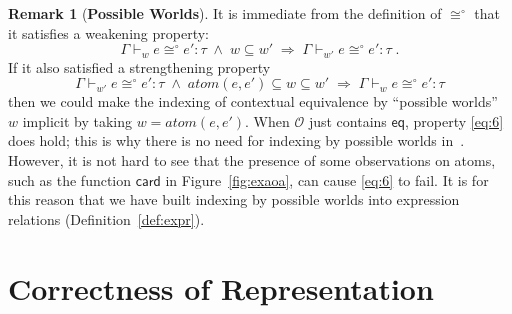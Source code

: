 \documentclass{LMCS}
\theoremstyle{plain}
\theoremstyle{definition}
\newtheorem{remark}[thm]{Remark}
\newcommand{\atoms}{\mathit{atom}}
\renewcommand{\conj}{\wedge}
\newcommand{\ent}{\vdash}
\renewcommand{\exp}[1][e]{#1}
\newcommand{\imp}{\Rightarrow}
\newcommand{\kw}[1]{\mathsf{#1}}
\newcommand{\Obs}{\mathcal{O}}
\newcommand{\OBS}[1][obs]{\kw{#1}}
\newcommand{\ofty}{:}
\newcommand{\opeqo}{\cong^{\circ}}
\newcommand{\ty}{\tau}
\newcommand{\w}[1][w]{#1}
\begin{document}
\begin{remark}[\textbf{Possible Worlds}]
  \label{rem:posw}
  It is immediate from the definition of $\opeqo$ that it satisfies a
  weakening property:
  \begin{equation}
    \label{eq:7}
    \Gamma\ent_{\w}\exp\opeqo\exp'\ofty\ty
    \;\conj\;
    \w\subseteq\w'
    \;\imp\;
    \Gamma\ent_{\w'}\exp\opeqo\exp'\ofty\ty\;.   
  \end{equation}
  If it also satisfied a strengthening property
  \begin{equation}
    \label{eq:6}
    \Gamma\ent_{\w'}\exp\opeqo\exp'\ofty\ty \;\conj\;
    \atoms(\exp,\exp')\subseteq\w\subseteq\w'
    \;\imp\; \Gamma\ent_{\w}\exp\opeqo\exp'\ofty\ty
  \end{equation}
  then we could make the indexing of contextual equivalence by
  ``possible worlds'' $\w$ implicit by taking $\w=\atoms(\exp,\exp')$.
  When $\Obs$ just contains $\OBS[eq]$, property \eqref{eq:6} does
  hold; this is why there is no need for indexing by possible worlds
  in~\cite{ShinwellMR:freafp,PittsAM:monsf}. However, it is not hard
  to see that the presence of some observations on atoms, such as the
  function $\OBS[card]$ in Figure~\ref{fig:exaoa}, can cause
  \eqref{eq:6} to fail. It is for this reason that we have built
  indexing by possible worlds into expression relations
  (Definition~\ref{def:expr}).
\end{remark}

\section{Correctness of Representation}
\label{sec:corr-repr}
\end{document}
